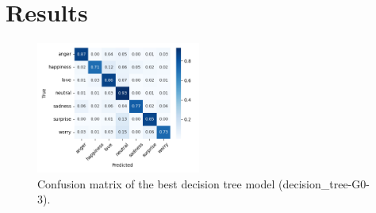 \section{Results}
\label{sec:results}


\begin{figure}[H]
    \centering
    \includegraphics[width=0.48\textwidth]{images/decision_tree_confusion_matrix.png}
    \caption{Confusion matrix of the best decision tree model (decision\_tree-G0-3).}
    \label{fig:confusion_matrix}
\end{figure}
\cite{emotionRecognitionFromText}